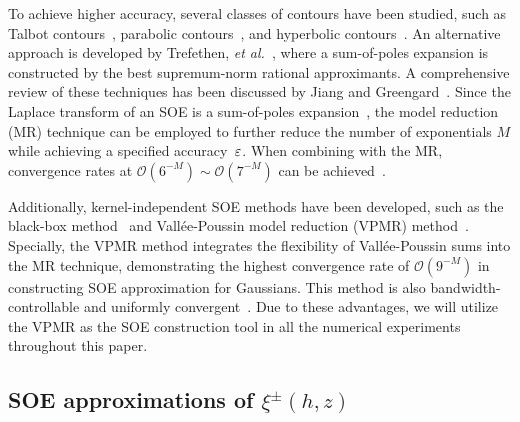 To achieve higher accuracy, several classes of contours have been studied, such as Talbot contours~\cite{lin2004numerical}, parabolic contours~\cite{makarov2000exponentially}, and hyperbolic contours~\cite{lopez2004numerical}. 
An alternative approach is developed by Trefethen, \emph{et al.}~\cite{trefethen2006talbot}, where a sum-of-poles expansion is constructed by the best supremum-norm rational approximants.
A comprehensive review of these techniques has been discussed by Jiang and Greengard~\cite{jiang2021approximating}.
Since the Laplace transform of an SOE is a sum-of-poles expansion~\cite{greengard2018anisotropic}, the model reduction (MR) technique can be employed to further reduce the number of exponentials $M$ while achieving a specified accuracy~$\varepsilon$.
When combining with the MR, convergence rates at $\mathcal{O}(6^{-M}) \sim \mathcal{O}(7^{-M})$ can be achieved~\cite{jiang2021approximating}.

Additionally, kernel-independent SOE methods have been developed, such as the black-box method~\cite{greengard2018anisotropic} and Vall\'ee-Poussin model reduction (VPMR) method~\cite{gao2021kernelindependent}. 
Specially, the VPMR method integrates the flexibility of Vall\'ee-Poussin sums into the MR technique, demonstrating the highest convergence rate of $\mathcal{O}(9^{-M})$ in constructing SOE approximation for Gaussians. 
This method is also bandwidth-controllable and uniformly convergent~\cite{AAMM-13-1126}. 
Due to these advantages, we will utilize the VPMR as the SOE construction tool in all the numerical experiments throughout this paper.




\subsection{SOE approximations of $\xi^{\pm}(h,z)$} \label{subsec::SOEapp}

